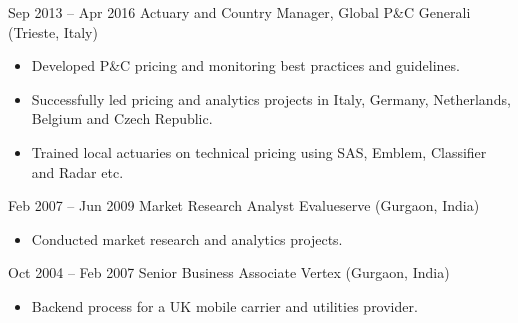 \documentclass[a4paper,]{fortysecondscv}
\begin{document}
\begin{cvtable}[2.5]
{\begin{itemize}[nosep, leftmargin=0pt]
				\end{itemize}
			}
		\cvitem
			{Sep 2013 -- Apr 2016}
			{Actuary and Country Manager, Global P\&C}
			{Generali (Trieste, Italy)}
			{
				\vspace{-\topsep}
				\begin{itemize}[nosep, leftmargin=0pt] %
					\item Developed P\&C pricing and monitoring best practices and guidelines.
					\item Successfully led pricing and analytics projects in Italy, Germany, Netherlands, Belgium and Czech Republic.
					\item Trained local actuaries on technical pricing using SAS, Emblem, Classifier and Radar etc.
				\end{itemize}
			}
		\cvitem
			{Feb 2007 -- Jun 2009}
			{Market Research Analyst}
			{Evalueserve (Gurgaon, India)}
			{
				\vspace{-\topsep}
				\begin{itemize}[nosep, leftmargin=0pt] %
					\item Conducted market research and analytics projects.
				\end{itemize}
			}
		\cvitem
			{Oct 2004 -- Feb 2007}
			{Senior Business Associate}
			{Vertex (Gurgaon, India)}
			{ 
				\vspace{-\topsep}
				\begin{itemize}[nosep, leftmargin=0pt] %
					\item Backend process for a UK mobile carrier and utilities provider.
				\end{itemize}
			}
	\end{cvtable}


\end{document}
